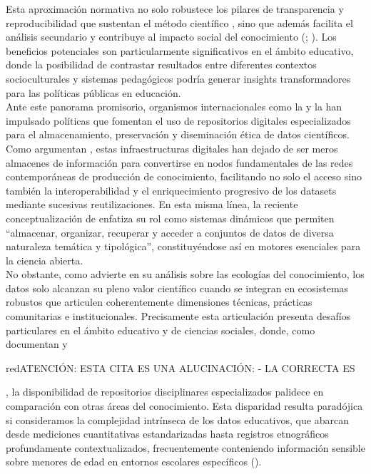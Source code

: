 \documentclass[runningheads]{llncs}
\def \bchregi {\begin{color}{red}}
\def \echregi {\end{color}}
\begin{document}
Esta aproximación normativa no solo robustece los pilares de transparencia y reproducibilidad que sustentan el método científico \cite{oecd2020}, sino que además facilita el análisis secundario y contribuye al impacto social del conocimiento (\cite{ec2016}; \cite{wilkinson2016}). Los beneficios potenciales son particularmente significativos en el ámbito educativo, donde la posibilidad de contrastar resultados entre diferentes contextos socioculturales y sistemas pedagógicos podría generar insights transformadores para las políticas públicas en educación.\\

Ante este panorama promisorio, organismos internacionales como la \cite{unesco2021} y la \cite{oecd2020} han impulsado políticas que fomentan el uso de repositorios digitales especializados para el almacenamiento, preservación y diseminación ética de datos científicos. Como argumentan \cite{borgman2018}, estas infraestructuras digitales han dejado de ser meros almacenes de información para convertirse en nodos fundamentales de las redes contemporáneas de producción de conocimiento, facilitando no solo el acceso sino también la interoperabilidad y el enriquecimiento progresivo de los datasets mediante sucesivas reutilizaciones. En esta misma línea, la reciente conceptualización de \cite[p.~27]{avila2024} enfatiza su rol como sistemas dinámicos que permiten ``almacenar, organizar, recuperar y acceder a conjuntos de datos de diversa naturaleza temática y tipológica'', constituyéndose así en motores esenciales para la ciencia abierta.\\

No obstante, como advierte \cite{borgman2016} en su análisis sobre las ecologías del conocimiento, los datos solo alcanzan su pleno valor científico cuando se integran en ecosistemas robustos que articulen coherentemente dimensiones técnicas, prácticas comunitarias e institucionales. Precisamente esta articulación presenta desafíos particulares en el ámbito educativo y de ciencias sociales, donde, como documentan \cite{kraehmer2023} y \bchregi ATENCIÓN: ESTA CITA ES UNA ALUCINACIÓN: \cite{gray2023} - LA CORRECTA ES \cite{Lamb2024} \echregi, la disponibilidad de repositorios disciplinares especializados palidece en comparación con otras áreas del conocimiento. Esta disparidad resulta paradójica si consideramos la complejidad intrínseca de los datos educativos, que abarcan desde mediciones cuantitativas estandarizadas hasta registros etnográficos profundamente contextualizados, frecuentemente conteniendo información sensible sobre menores de edad en entornos escolares específicos (\cite{gomes2022}).\\
\end{document}
